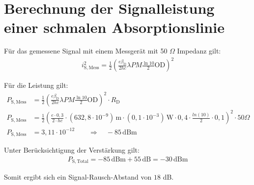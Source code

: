 
\section{Berechnung der Signalleistung einer schmalen Absorptionslinie}
\label{sec:signalAbsorp}

Für das gemessene Signal mit einem Messgerät mit 50 $\Omega$ Impedanz gilt:
\begin{gather}
    i_\mathrm{S,Mess}^2 = \frac{1}{2}(\frac{e\beta_\mathrm{D}}{2hc}\lambda P M \frac{\ln10}{2}\mathrm{OD})^2
\end{gather}

Für die Leistung gilt:
\begin{align}
    \label{eq:leistungPhotosignal}
    P_\mathrm{S,Mess} &= \frac{1}{2}(\frac{e\beta_\mathrm{D}}{2hc}\lambda P M \frac{\ln10}{2}\mathrm{OD})^2 \cdot R_\mathrm{D}\\
    P_\mathrm{S,Mess} &= \frac{1}{2} ( \frac{e\cdot 0,3}{2\cdot h c} \cdot (632,8 \cdot 10^{-9}) \, \mathrm{m} \cdot (0,1 \cdot 10^{-3}) \, \mathrm{W} \cdot 0,4 \cdot \frac{ln(10)}{2} \cdot 0,1)^2 \cdot 50 \Omega \\
    P_\mathrm{S,Mess} &= 3,11 \cdot 10^{-12} \qquad \Rightarrow \quad -85 \, \mathrm{dBm}
\end{align}

Unter Berücksichtigung der Verstärkung gilt:
\begin{gather}
    P_\mathrm{S,Total} = -85 \, \text{dBm} + 55 \, \text{dB} = -30 \, \text{dBm}
\end{gather}

Somit ergibt sich ein Signal-Rausch-Abstand von $18$ dB.